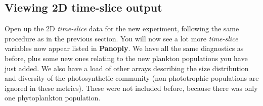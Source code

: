 \documentclass[11pt,fleqn]{book} %
\begin{document}

\subsection{Viewing 2D time-slice output}

Open up the 2D \textit{time-slice} data for the new experiment, following the same procedure as in the previous section. You will now see a lot more \textit{time-slice} variables now appear listed in \textbf{Panoply}. We have all the same diagnostics as before, plus some new ones relating to the new plankton populations you have just added. We also have a load of other arrays describing the size distribution and diversity of the photosynthetic community (non-phototrophic populations are ignored in these metrics). These were not included before, because there was only one phytoplankton population.
\end{document}
